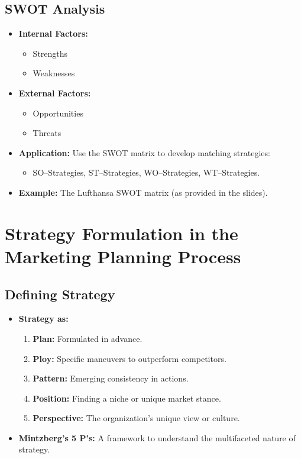 \documentclass[12pt,a4paper]{report}
\begin{document}
\section{SWOT Analysis}
\begin{itemize}
    \item \textbf{Internal Factors:}
    \begin{itemize}
         \item Strengths
         \item Weaknesses
    \end{itemize}
    \item \textbf{External Factors:}
    \begin{itemize}
         \item Opportunities
         \item Threats
    \end{itemize}
    \item \textbf{Application:} Use the SWOT matrix to develop matching strategies:
    \begin{itemize}
         \item SO--Strategies, ST--Strategies, WO--Strategies, WT--Strategies.
    \end{itemize}
    \item \textbf{Example:} The Lufthansa SWOT matrix (as provided in the slides).
\end{itemize}

\chapter{Strategy Formulation in the Marketing Planning Process}

\section{Defining Strategy}
\begin{itemize}
    \item \textbf{Strategy as:}
    \begin{enumerate}[label=\alph*.]
         \item \textbf{Plan:} Formulated in advance.
         \item \textbf{Ploy:} Specific maneuvers to outperform competitors.
         \item \textbf{Pattern:} Emerging consistency in actions.
         \item \textbf{Position:} Finding a niche or unique market stance.
         \item \textbf{Perspective:} The organization’s unique view or culture.
    \end{enumerate}
    \item \textbf{Mintzberg’s 5 P’s:} A framework to understand the multifaceted nature of strategy.
\end{itemize}
\end{document}
